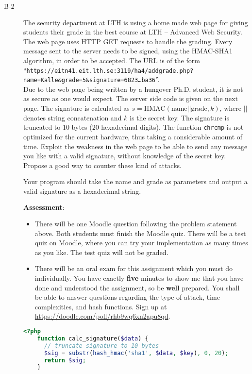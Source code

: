 \documentclass{article}
\begin{document}
\begin{description}
			
			\item[B-2]{The security department at LTH is using a home made web page for giving students their grade in the best course
				at LTH -- Advanced Web Security. The web page uses HTTP GET requests to handle the grading. Every message sent to the server
				needs to be signed, using the HMAC-SHA1 algorithm, in order to be accepted. The URL is of the form\\
				``\texttt{https://eitn41.eit.lth.se:3119/ha4/addgrade.php?name=Kalle\&grade=5\&signature=6823\ldots ba36}''.\\
				Due to the web page being written by a hungover Ph.D. student, it is not as secure as one would expect.
				The server side code is given on the next page.
				The signature is calculated as $s = \textrm{HMAC}(\textrm{name}||\textrm{grade}, k)$, where $||$ denotes 
				string concatenation and $k$ is the secret key. The signature is truncated to 10 bytes (20 hexadecimal digits).
				The function \texttt{chrcmp} is not optimized for the current hardware, 
				thus taking a considerable amount of time.
				Exploit the weakness in the web page to be able to send any message you like with a valid signature, 
				without knowledge of the secret key. Propose a good way to counter these kind of attacks.
				
				Your program should take the name and grade as parameters and output a valid signature as a hexadecimal string.
				
				\textbf{Assessment}:
				\begin{itemize}
					\item There will be one Moodle question following the problem statement above. Both students must finish the Moodle quiz.
					There will be a test quiz on Moodle, where you can try your implementation as many times as you like. The test quiz will not be graded.
					
					\item There will be an oral exam for this assignment which you must do individually. You have exactly \textbf{five} minutes to show me that you have done
					and understood the assignment, so be \textbf{well} prepared. 
					You shall be able to answer questions regarding the type of attack, time complexities, and hash functions.
					Sign up at \url{https://doodle.com/poll/rhb9wq6xn2apu8qd}.
				\end{itemize}
				
	\begin{lstlisting}[float=h, style=customc, language=php] 
	<?php
	function calc_signature($data) {
	  // truncate signature to 10 bytes
	  $sig = substr(hash_hmac('sha1', $data, $key), 0, 20);
	  return $sig;
	}
	

\end{lstlisting}}
\end{description}
\end{document}
